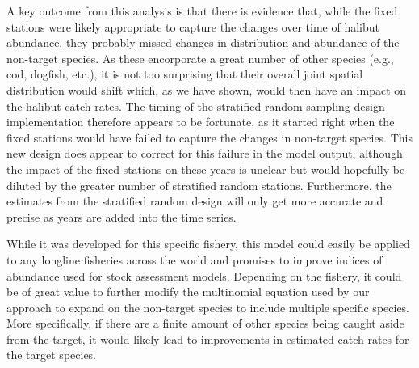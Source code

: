 \documentclass[12pt]{article}\usepackage[]{graphicx}\usepackage[]{color}
\begin{document}
A key outcome from this analysis is that there is evidence that, while the fixed stations were likely appropriate to capture the changes over time of halibut abundance, they probably missed changes in distribution and abundance of the non-target species. As these encorporate a great number of other species (e.g., cod, dogfish, etc.), it is not too surprising that their overall joint spatial distribution would shift which, as we have shown, would then have an impact on the halibut catch rates. The timing of the stratified random sampling design implementation therefore appears to be fortunate, as it started right when the fixed stations would have failed to capture the changes in non-target species. This new design does appear to correct for this failure in the model output, although the impact of the fixed stations on these years is unclear but would hopefully be diluted by the greater number of stratified random stations. Furthermore, the estimates from the stratified random design will only get more accurate and precise as years are added into the time series.

While it was developed for this specific fishery, this model could easily be applied to any longline fisheries across the world and promises to improve indices of abundance used for stock assessment models. Depending on the fishery, it could be of great value to further modify the multinomial equation used by our approach to expand on the non-target species to include multiple specific species. More specifically, if there are a finite amount of other species being caught aside from the target, it would likely lead to improvements in estimated catch rates for the target species.
\end{document}
